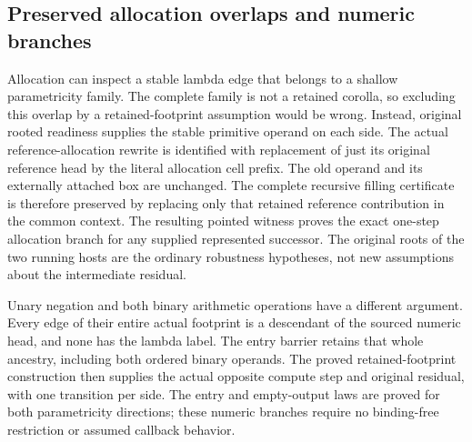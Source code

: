 \subsection{Preserved allocation overlaps and numeric branches}
Allocation can inspect a stable lambda edge that belongs to a shallow
parametricity family. The complete family is not a retained corolla, so
excluding this overlap by a retained-footprint assumption would be wrong.
Instead, original rooted readiness supplies the stable primitive operand
on each side. The actual reference-allocation rewrite is identified with
replacement of just its original reference head by the literal allocation
cell prefix. The old operand and its externally attached box are unchanged.
The complete recursive filling certificate is therefore preserved by
replacing only that retained reference contribution in the common context.
The resulting pointed witness proves the exact one-step allocation branch
for any supplied represented successor. The original roots of the two
running hosts are the ordinary robustness hypotheses, not new assumptions
about the intermediate residual.

Unary negation and both binary arithmetic operations have a different
argument. Every edge of their entire actual footprint is a descendant of
the sourced numeric head, and none has the lambda label. The entry barrier
retains that whole ancestry, including both ordered binary operands.
The proved retained-footprint construction then supplies the actual
opposite compute step and original residual, with one transition per side.
The entry and empty-output laws are proved for both parametricity directions;
these numeric branches require no binding-free restriction or assumed
callback behavior.

\par{}
\par{}
\par{}
\par{}
\par{}

